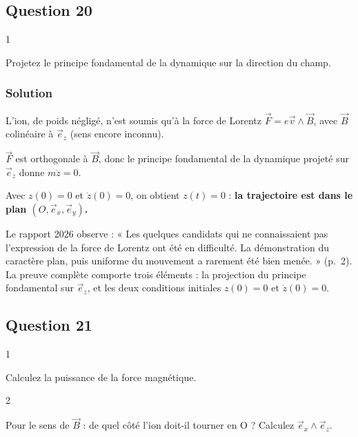 \documentclass[11pt,a4paper]{article}
\begin{document}
\hypertarget{question-20}{%
\subsection{Question 20}\label{question-20}}

\begin{indication}{1}

Projetez le principe fondamental de la dynamique sur la direction du champ.

\end{indication}

\hypertarget{solution-19}{%
\subsubsection{Solution}\label{solution-19}}

L'ion, de poids négligé, n'est soumis qu'à la force de Lorentz \(\vec F=e\vec v\wedge\vec B\), avec \(\vec B\) colinéaire à \(\vec e_z\) (sens encore inconnu).

\(\vec F\) est orthogonale à \(\vec B\), donc le principe fondamental de la dynamique projeté sur \(\vec e_z\) donne \(m\ddot z=0\).

Avec \(z(0)=0\) et \(\dot z(0)=0\), on obtient \(z(t)=0\) : \textbf{la trajectoire est dans le plan \((O,\vec e_x,\vec e_y)\).}

\begin{jury}

Le rapport 2026 observe : « Les quelques candidats qui ne connaissaient pas l'expression de la force de Lorentz ont été en difficulté. La démonstration du caractère plan, puis uniforme du mouvement a rarement été bien menée. » (p.~2). La preuve complète comporte trois éléments : la projection du principe fondamental sur \(\vec e_z\), et les deux conditions initiales \(z(0)=0\) et \(\dot z(0)=0\).

\end{jury}

\hypertarget{question-21}{%
\subsection{Question 21}\label{question-21}}

\begin{indication}{1}

Calculez la puissance de la force magnétique.

\end{indication}

\begin{indication}{2}

Pour le sens de \(\vec B\) : de quel côté l'ion doit-il tourner en O ? Calculez \(\vec e_x\wedge\vec e_z\).

\end{indication}
\end{document}
